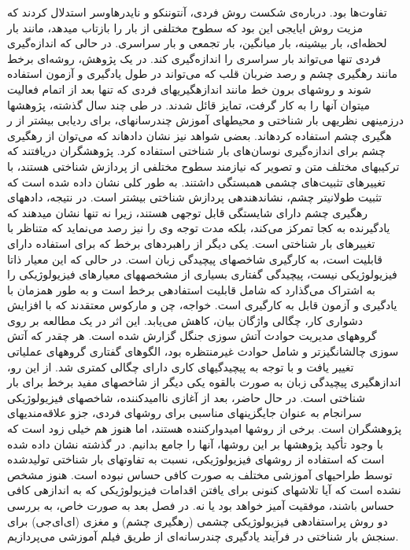 تفاوت‌ها بود.  درباره‌ی شکست  روش  فردی، آنتوننکو  و  نایدرهاوسر استدلال  كردند  كه  مزیت روش 
ایایجی این بود كه سطوح مختلفی از بار را بازتاب میدهد، مانند بار لحظه‌ای، بار بيشينه، بار ميانگين،
بار تجمعی و  بار  سراسری. در حالی كه اندازه‌گيری فردی تنها  می‌تواند بار سراسری را  اندازه‌گيری
كند.
\cite{antonenko2010influence}
در یک پژوهش، روشه‌ای برخط 
مانند رهگيری چشم و رصد ضربان قلب 
كه می‌تواند در طول
یادگيری و آزمون استفاده شوند و روشهای برون خط 
مانند اندازهگيریهای فردی كه تنها بعد از اتمام 
فعاليت میتوان آنها را به كار گرفت، تمایز قائل شدند. در طی چند سال گذشته، پژوهشها درزمينهی
نظریهی بار شناختی و محيطهای آموزش چندرسانهای، برای ردیابی بيشتر از ر هگيری چشم  استفاده 
كردهاند. بعضی شواهد نيز نشان دادهاند كه می‌توان از رهگيری چشم برای اندازه‌گيری نوسان‌های بار 
شناختی استفاده  كرد.  پژوهشگران  دریافتند كه  تركيبهای مختلف متن و  تصویر كه  نيازمند سطوح 
مختلفی از پردازش شناختی هستند، با تغييرهای تثبيت‌های چشمی 
همبستگی داشتند. به طور كلی
نشان داده شده است كه تثبيت طولانیتر چشم، نشاندهندهی پردازش شناختی بيشتر است. در نتيجه،
دادههای رهگيری چشم دارای شایستگی قابل توجهی هستند، زیرا نه تنها نشان میدهند كه یادگيرنده به 
كجا تمركز می‌كند، بلکه مدت توجه وی را نيز رصد می‌نماید كه متناظر با تغييرهای بار شناختی است.
\cite{sweller2011measuring}
یکی دیگر از راهبردهای برخط كه برای استفاده دارای قابليت است، به كارگيری شاخصهای پيچيدگی
زبان است. در حالی كه این معيار ذاتا فيزیولوژیکی نيست، پيچيدگی گفتاری بسياری از مشخصههای
معيارهای فيزیولوژیکی را به اشتراک می‌گذارد كه شامل قابليت استفادهی برخط است و به طور همزمان با 
یادگيری و آزمون قابل به كارگيری است.
\cite{sweller2011measuring}
خواجه، چن و ماركوس معتقدند كه با افزایش دشواری كار، 
چگالی واژگان بيان، كاهش می‌یابد. این اثر در یک مطالعه بر روی گروههای مدیریت حوادث آتش سوزی
جنگل  گزارش  شده  است.  هر چقدر  كه آتش سوزی چالشانگيزتر و  شامل  حوادث  غيرمنتظره بود، 
الگوهای گفتاری گروههای عملياتی تغيير یافت و با توجه به پيچيدگیهای كاری دارای چگالی كمتری شد. از این رو، اندازهگيری پيچيدگی زبان به صورت بالقوه یکی دیگر از شاخصهای مفيد برخط برای بار 
شناختی است.
\cite{khawaja2010using}
در حال حاضر، بعد از آغازی نااميدكننده، شاخصهای فيزیولوژیکی سرانجام به عنوان جایگزینهای
مناسبی برای روشهای فردی، جزو علاقه‌مندیهای پژوهشگران است. برخی از روشها اميدواركننده
هستند، اما هنوز هم خيلی زود است كه با وجود تأكيد پژوهشها بر این روشها، آنها را جامع بدانيم. در 
گذشته نشان داده  شده  است كه استفاده از روشهای فيزیولوژیکی، نسبت به تفاوتهای بار شناختی
توليدشده توسط طراحیهای آموزشی مختلف به صورت كافی حساس نبوده است. هنوز مشخص نشده 
است  كه  آیا تلاشهای كنونی برای یافتن اقدامات  فيزیولوژیکی كه  به  اندازهی  كافی حساس  باشند،
موفقيت آميز خواهد  بود  یا نه.
\cite{sweller2011measuring}
در  فصل  بعد  به  صورت  خاص،  به  بررسی  دو  روش  پراستفادهی 
فيزیولوژیکی چشمی (رهگيری چشم) و مغزی (ای‌ای‌جی) برای سنجش بار شناختی  در فرآیند یادگيری
چندرسانه‌ای از طریق فيلم آموزشی می‌پردازیم.

